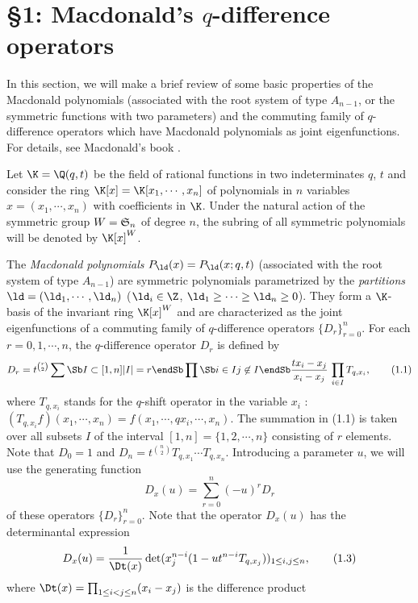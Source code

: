 \section{\S1:  Macdonald's $q$-difference operators}
%
In this section, we will make a brief review of some basic properties 
of the Macdonald polynomials (associated with the root system of type 
$A_{n-1}$, or the symmetric functions with two parameters) and 
the commuting family of $q$-difference operators
which have Macdonald polynomials as joint eigenfunctions.  
For details, see Macdonald's book \cite{Ma}. 
\par\smallpagebreak\par
Let $\K=\Q(q,t)$ be the field of rational functions in two indeterminates 
$q$, $t$ 
and consider the ring $\K[x]=\K[x_1,\cdots,x_n]$ of polynomials in $n$ 
variables $x=(x_1,\cdots,x_n)$ with coefficients in $\K$.  
Under the natural action of the symmetric group $W=\frak{S}_n$ of 
degree $n$, the subring of all symmetric polynomials will be denoted 
by $\K[x]^{W}$. 
\par 
The {\it Macdonald polynomials} $P_{\ld}(x)=P_{\ld}(x;q,t)$ 
(associated with the root system of type $A_{n-1}$) 
are symmetric polynomials parametrized by the 
{\it partitions } $\ld=(\ld_1,\cdots,\ld_n)$
($\ld_i\in\Z$, $\ld_1\ge\cdots\ge\ld_n\ge0$).  
They form a $\K$-basis of the invariant ring $\K[x]^W$
and are characterized as the joint eigenfunctions 
of a commuting family of $q$-difference operators 
$\{D_r\}_{r=0}^n$. 
For each $r=0,1,\cdots,n$, the $q$-difference operator $D_r$ 
is defined by 
$$
D_r=t^{\binom{r}{2}} \sum\Sb I\subset[1,n] \\ |I|=r \endSb 
\prod\Sb i\in I\\ j\not\in I\endSb 
\frac{tx_i-x_j}{x_i-x_j} \, \prod_{i\in I}T_{q,x_i}, 
\tag{1.1}
$$
where 
$T_{q,x_i}$ stands for the $q$-shift operator in the variable 
$x_i$ : 
$(T_{q,x_i}f)(x_1,\cdots,x_n)=f(x_1,\cdots,q x_i,\cdots,x_n)$. 
The summation in (1.1) is taken over all subsets $I$ of the interval 
$[1,n]=\{1,2,\cdots,n\}$ consisting of $r$ elements. 
Note that $D_0=1$ and 
$D_n=t^{\binom{n}{2}}T_{q,x_1}\cdots T_{q,x_n}$. 
Introducing a parameter $u$, we will use the generating function
$$
D_x(u)=\sum_{r=0}^n (-u)^r D_r
\tag{1.2} 
$$
of these operators $\{D_r\}_{r=0}^n$. 
Note that the operator $D_x(u)$ has the determinantal expression
$$
D_x(u)=\frac{1}{\Dt(x)}\det(x_j^{n-i}(1-ut^{n-i}T_{q,x_j}))_{1\le i,j\le n},
\tag{1.3}
$$
where $\Dt(x)=\prod_{1\le i<j\le n}(x_i-x_j)$ is the difference product 
